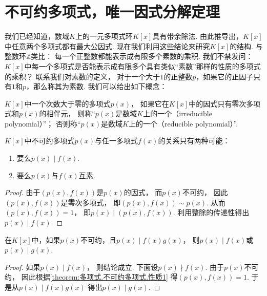 \section{不可约多项式，唯一因式分解定理}
我们已经知道，数域\(K\)上的一元多项式环\(K[x]\)具有带余除法.
由此推导出，\(K[x]\)中任意两个多项式都有最大公因式.
现在我们利用这些结论来研究\(K[x]\)的结构.
与整数环\(\mathbb{Z}\)类比：
每一个正整数都能表示成有限多个素数的乘积.
我们不禁发问：\(K[x]\)中每一个多项式是否能表示成有限多个具有类似“素数”那样的性质的多项式的乘积？
联系我们对素数的定义，
对于一个大于\(1\)的正整数\(p\)，如果它的正因子只有\(1\)和\(p\)，那么称其为素数.
我们可以给出如下概念：
\begin{definition}
\(K[x]\)中一个次数大于零的多项式\(p(x)\)，
如果它在\(K[x]\)中的因式只有零次多项式和\(p(x)\)的相伴元，
则称“\(p(x)\)是数域\(K\)上的一个（irreducible polynomial）”；
否则称“\(p(x)\)是数域\(K\)上的一个（reducible polynomial）”.
\end{definition}

\begin{property}\label{theorem:多项式.不可约多项式.性质1}
\(K[x]\)中不可约多项式\(p(x)\)与任一多项式\(f(x)\)的关系只有两种可能：
\begin{enumerate}
	\item 要么\(p(x) \mid f(x)\).
	\item 要么\(p(x)\)与\(f(x)\)互素.
\end{enumerate}
\begin{proof}
由于\((p(x),f(x))\)是\(p(x)\)的因式，
而\(p(x)\)不可约，
因此\((p(x),f(x))\)是零次多项式，
即\((p(x),f(x)) \sim p(x)\).
从而\((p(x),f(x))=1\)，
即\(p(x) \mid (p(x),f(x))\).
利用整除的传递性得出\(p(x) \mid f(x)\).
\end{proof}
\end{property}

\begin{property}\label{theorem:多项式.不可约多项式.性质2}
在\(K[x]\)中，如果\(p(x)\)不可约，且\(p(x) \mid f(x) g(x)\)，
则\(p(x) \mid f(x)\)或\(p(x) \mid g(x)\).
\begin{proof}
如果\(p(x) \mid f(x)\)，
则结论成立.
下面设\(p(x) \nmid f(x)\).
由于\(p(x)\)不可约，
因此根据\cref{theorem:多项式.不可约多项式.性质1}
得\((p(x),f(x))=1\).
于是从\(p(x) \mid f(x) g(x)\)
得出\(p(x) \mid g(x)\).
\end{proof}
\end{property}

